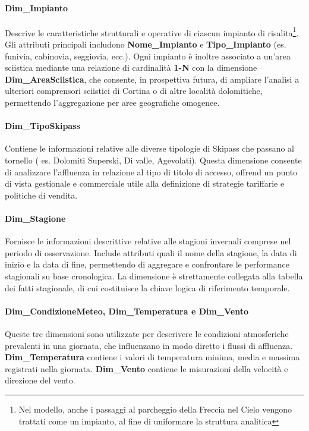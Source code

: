 \paragraph{Dim\_Impianto}
Descrive le caratteristiche strutturali e operative di ciascun impianto di risalita\footnote{Nel modello, anche i passaggi al parcheggio della Freccia nel Cielo vengono trattati come un impianto, al fine di uniformare la struttura analitica}. Gli attributi principali includono \textbf{Nome\_Impianto} e \textbf{Tipo\_Impianto} (es. funivia, cabinovia, seggiovia, ecc.).
Ogni impianto  è inoltre associato a un'area sciistica mediante una relazione di cardinalità \textbf{1-N} con la dimensione \textbf{Dim\_AreaSciistica}, che consente, in prospettiva futura, di ampliare l’analisi a ulteriori comprensori sciistici di Cortina o di altre località dolomitiche, permettendo l’aggregazione per aree geografiche omogenee.

\paragraph{Dim\_TipoSkipass}
Contiene le informazioni relative alle diverse tipologie di Skipass 
che passano al tornello ( es. Dolomiti Superski, Di valle, Agevolati).
Questa dimensione consente di analizzare l'affluenza in relazione al tipo di titolo di accesso, offrend un punto di vista gestionale e commerciale utile alla definizione di strategie tariffarie e politiche di vendita.

\paragraph{Dim\_Stagione}
Fornisce le informazioni descrittive relative alle stagioni invernali comprese nel periodo di osservazione.
Include attributi quali il nome della stagione, la data di inizio e la data di fine, permettendo di aggregare e confrontare le performance stagionali su base cronologica.
La dimensione è strettamente collegata alla tabella dei fatti stagionale, di cui costituisce la chiave logica di riferimento temporale.

\paragraph{Dim\_CondizioneMeteo, Dim\_Temperatura e Dim\_Vento}
Queste tre dimensioni sono utilizzate per descrivere le condizioni atmosferiche prevalenti in una giornata, che influenzano in modo diretto i flussi di affluenza.
\textbf{Dim\_Temperatura} contiene i valori di temperatura minima, media e massima registrati nella giornata.
\textbf{Dim\_Vento} contiene le misurazioni della velocità e direzione del vento.\\


